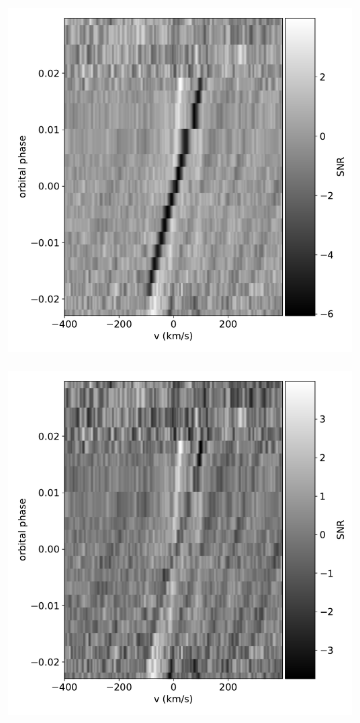 \documentclass[twocolumn]{aastex631}
\begin{document}
        \begin{figure}[ht!]
        \begin{subfigure}[b]{0.333\textwidth}
            \includegraphics[width=\textwidth]{plots/raw-ccf-before/KELT-20b.20190504.Fe.blue.CCFs-raw.pdf}
            \label{fig:raw-ccf-before-Fe-red}
        \end{subfigure}
        \begin{subfigure}[b]{0.333\textwidth}
            \includegraphics[width=\textwidth]{plots/raw-ccf-after/KELT-20b.20190504.Fe.blue.CCFs-raw.pdf}
            \label{fig:raw-ccf-before-Fe-blue}
        \end{subfigure}
        

\end{figure}
\end{document}

